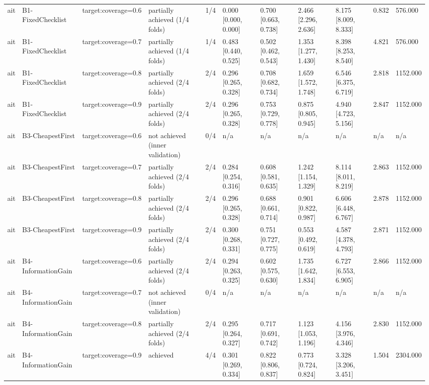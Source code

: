 \begin{table}[!ht]
{\begin{tabular}{lllllllllll}
ait & B1-FixedChecklist & target:coverage=0.6 & partially achieved (1/4 folds) & 1/4 & 0.000 [0.000, 0.000] & 0.700 [0.663, 0.738] & 2.466 [2.296, 2.636] & 8.175 [8.009, 8.333] & 0.832 & 576.000 \\
ait & B1-FixedChecklist & target:coverage=0.7 & partially achieved (1/4 folds) & 1/4 & 0.483 [0.440, 0.525] & 0.502 [0.462, 0.543] & 1.353 [1.277, 1.430] & 8.398 [8.253, 8.540] & 4.821 & 576.000 \\
ait & B1-FixedChecklist & target:coverage=0.8 & partially achieved (2/4 folds) & 2/4 & 0.296 [0.265, 0.328] & 0.708 [0.682, 0.734] & 1.659 [1.572, 1.748] & 6.546 [6.375, 6.719] & 2.818 & 1152.000 \\
ait & B1-FixedChecklist & target:coverage=0.9 & partially achieved (2/4 folds) & 2/4 & 0.296 [0.265, 0.328] & 0.753 [0.729, 0.778] & 0.875 [0.805, 0.945] & 4.940 [4.723, 5.156] & 2.847 & 1152.000 \\
ait & B3-CheapestFirst & target:coverage=0.6 & not achieved (inner validation) & 0/4 & n/a & n/a & n/a & n/a & n/a & n/a \\
ait & B3-CheapestFirst & target:coverage=0.7 & partially achieved (2/4 folds) & 2/4 & 0.284 [0.254, 0.316] & 0.608 [0.581, 0.635] & 1.242 [1.154, 1.329] & 8.114 [8.011, 8.219] & 2.863 & 1152.000 \\
ait & B3-CheapestFirst & target:coverage=0.8 & partially achieved (2/4 folds) & 2/4 & 0.296 [0.265, 0.328] & 0.688 [0.661, 0.714] & 0.901 [0.822, 0.987] & 6.606 [6.448, 6.767] & 2.878 & 1152.000 \\
ait & B3-CheapestFirst & target:coverage=0.9 & partially achieved (2/4 folds) & 2/4 & 0.300 [0.268, 0.331] & 0.751 [0.727, 0.775] & 0.553 [0.492, 0.619] & 4.587 [4.378, 4.793] & 2.871 & 1152.000 \\
ait & B4-InformationGain & target:coverage=0.6 & partially achieved (2/4 folds) & 2/4 & 0.294 [0.263, 0.325] & 0.602 [0.575, 0.630] & 1.735 [1.642, 1.834] & 6.727 [6.553, 6.905] & 2.866 & 1152.000 \\
ait & B4-InformationGain & target:coverage=0.7 & not achieved (inner validation) & 0/4 & n/a & n/a & n/a & n/a & n/a & n/a \\
ait & B4-InformationGain & target:coverage=0.8 & partially achieved (2/4 folds) & 2/4 & 0.295 [0.264, 0.327] & 0.717 [0.691, 0.742] & 1.123 [1.053, 1.196] & 4.156 [3.976, 4.346] & 2.830 & 1152.000 \\
ait & B4-InformationGain & target:coverage=0.9 & achieved & 4/4 & 0.301 [0.269, 0.334] & 0.822 [0.806, 0.837] & 0.773 [0.724, 0.824] & 3.328 [3.206, 3.451] & 1.504 & 2304.000 \\

\end{tabular}}
\end{table}
